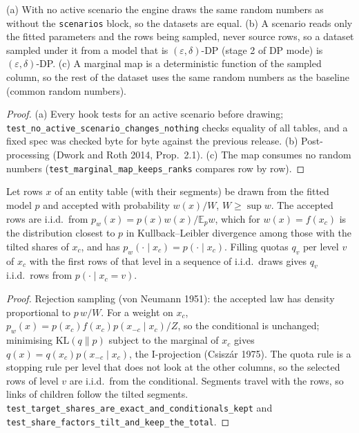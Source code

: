 \begin{proposition}\label{prop:simscenbase}
(a) With no active scenario the engine draws the same random numbers as without the \texttt{scenarios} block, so the
datasets are equal. (b) A scenario reads only the fitted parameters and the rows being sampled, never source rows,
so a dataset sampled under it from a model that is $(\varepsilon,\delta)$-DP (stage 2 of DP mode) is
$(\varepsilon,\delta)$-DP. (c) A marginal map is a deterministic function of the sampled column, so the rest of the
dataset uses the same random numbers as the baseline (common random numbers).
\end{proposition}
\begin{proof}
(a) Every hook tests for an active scenario before drawing; \texttt{test\_no\_active\_scenario\_changes\_nothing}
checks equality of all tables, and a fixed spec was checked byte for byte against the previous release. (b) Post-processing
(Dwork and Roth 2014, Prop.~2.1). (c) The map consumes no random numbers (\texttt{test\_marginal\_map\_keeps\_ranks}
compares row by row).
\end{proof}

\begin{proposition}\label{prop:simtilt}
Let rows $x$ of an entity table (with their segments) be drawn from the fitted model $p$ and accepted with
probability $w(x)/W$, $W\ge\sup w$. The accepted rows are i.i.d.\ from $p_w(x)=p(x)w(x)/\mathbb E_pw$, which for
$w(x)=f(x_c)$ is the distribution closest to $p$ in Kullback--Leibler divergence among those with the tilted shares of
$x_c$, and has $p_w(\cdot\mid x_c)=p(\cdot\mid x_c)$. Filling quotas $q_v$ per level $v$ of $x_c$ with the first rows
of that level in a sequence of i.i.d.\ draws gives $q_v$ i.i.d.\ rows from $p(\cdot\mid x_c=v)$.
\end{proposition}
\begin{proof}
Rejection sampling (von Neumann 1951): the accepted law has density proportional to $p\,w/W$. For a weight on $x_c$,
$p_w(x)=p(x_c)f(x_c)p(x_{-c}\mid x_c)/Z$, so the conditional is unchanged; minimising $\mathrm{KL}(q\|p)$ subject to
the marginal of $x_c$ gives $q(x)=q(x_c)p(x_{-c}\mid x_c)$, the I-projection (Csisz\'ar 1975). The quota rule is a
stopping rule per level that does not look at the other columns, so the selected rows of level $v$ are i.i.d.\ from the
conditional. Segments travel with the rows, so links of children follow the tilted segments.
\texttt{test\_target\_shares\_are\_exact\_and\_conditionals\_kept} and \texttt{test\_share\_factors\_tilt\_and\_keep\_the\_total}.
\end{proof}

